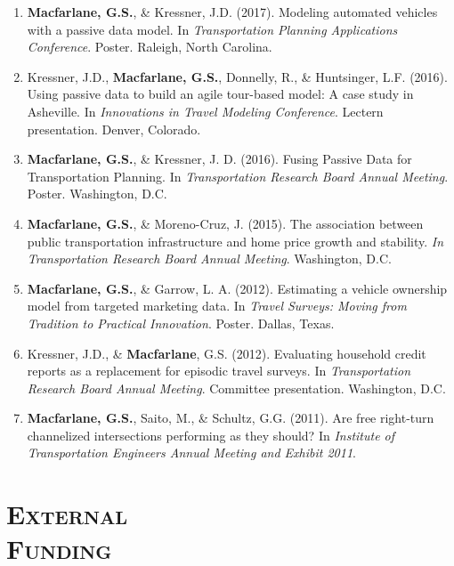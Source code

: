 \documentclass[margin,line]{res}
\newif\ifdetail
\newcounter{enuminitialize}
\newenvironment{myenum}[1][]
{%
 \setcounter{enuminitialize}{#1}
 \addtocounter{enuminitialize}{2}
 \begin{enumerate}[left= 4pt, itemsep=12pt, start=\value{enuminitialize}, label=\arabic*\addtocounter{enumi}{-2}]
}
{%
 \end{enumerate}
}
\newcommand{\secfont}{\scshape }
\begin{document}
\begin{resume}
\begin{myenum}[17]
\item \textbf{Macfarlane, G.S.}, \& Kressner, J.D. (2017). Modeling automated vehicles with a passive data model. In \textit{ Transportation Planning Applications Conference}. Poster. Raleigh, North Carolina.

\item Kressner, J.D., \textbf{Macfarlane, G.S.}, Donnelly, R., \& Huntsinger, L.F. (2016). Using passive data to build an agile tour-based model: A case study in Asheville. In \textit{ Innovations in Travel Modeling Conference}. Lectern presentation. Denver, Colorado. \ifdetail Citations: 7  \fi

\item \textbf{Macfarlane, G.S.}, \& Kressner, J. D. (2016). Fusing Passive Data for Transportation Planning. In \textit{ Transportation Research Board Annual Meeting}. Poster. Washington, D.C.

\item \textbf{Macfarlane, G.S.}, \& Moreno-Cruz, J. (2015). The association between public transportation infrastructure and home price growth and stability. \textit{ In Transportation Research Board Annual Meeting}. Washington, D.C.

\item \textbf{Macfarlane, G.S.}, \& Garrow, L. A. (2012). Estimating a vehicle ownership model from targeted marketing data. In \textit{ Travel Surveys: Moving from Tradition to Practical Innovation}. Poster. Dallas, Texas.

\item Kressner, J.D., \& \textbf{Macfarlane}, G.S. (2012). Evaluating household credit reports as a replacement for episodic travel surveys. In \textit{ Transportation Research Board Annual Meeting}. Committee presentation. Washington, D.C.

\item \textbf{Macfarlane, G.S.}, Saito, M., \& Schultz, G.G. (2011). Are free right-turn channelized intersections performing as they should? In \textit{ Institute of Transportation Engineers Annual Meeting and Exhibit 2011}.
\end{myenum}



\noindent\makebox[\linewidth]{\rule{\linewidth}{0.4pt}}
\section{\secfont External \\Funding}


\end{resume}
\end{document}
